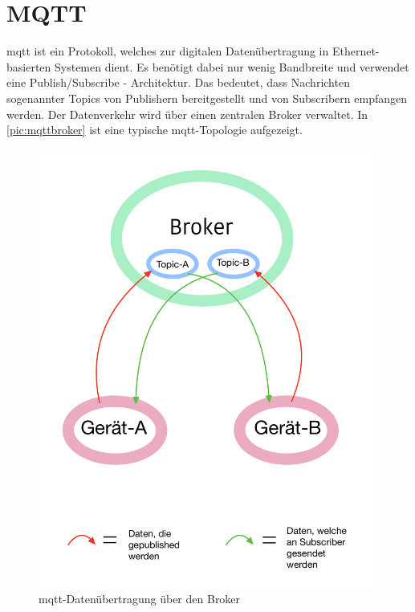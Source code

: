 \newpage
\section{MQTT} 
\label{sec:mqtt}
\acrfull{mqtt} ist ein Protokoll, welches zur digitalen Datenübertragung in Ethernet-basierten Systemen dient. Es benötigt dabei nur wenig Bandbreite und verwendet eine Publish/Subscribe - Architektur. Das bedeutet, dass Nachrichten sogenannter Topics von Publishern bereitgestellt und von Subscribern empfangen werden. Der Datenverkehr wird über einen zentralen Broker verwaltet. In \autoref{pic:mqttbroker} ist eine typische \acrshort{mqtt}-Topologie aufgezeigt. 

\begin{figure}[h]
    \begin{center}
        \includegraphics[width=11cm]{mqtt.pdf}
        \caption{
			\label{pic:mqttbroker}\acrshort{mqtt}-Datenübertragung über den Broker}
    \end{center}
\end{figure}

